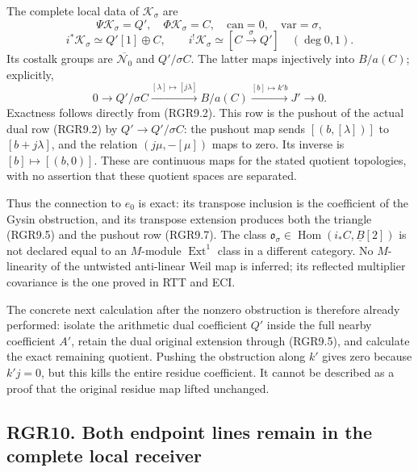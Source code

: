 The complete local data of \(\mathscr K_\sigma\) are \[
 \Psi\mathscr K_\sigma=Q',\quad \Phi\mathscr K_\sigma=C,
 \quad\mathrm{can}=0,\quad\mathrm{var}=\sigma,
\] \[
 i^*\mathscr K_\sigma\simeq Q'[1]\oplus C,
 \qquad i^!\mathscr K_\sigma\simeq[C\xrightarrow\sigma Q']
 \quad(\deg0,1).
 \tag{RGR9.6}
\] Its costalk groups are \(\overline{\mathcal N_0}\) and
\(Q'/\sigma C\). The latter maps injectively into \(B/a(C)\);
explicitly, \[
 0\longrightarrow Q'/\sigma C\xrightarrow{[\lambda]\mapsto[j\lambda]}
 B/a(C)\xrightarrow{[b]\mapsto k'b}J'\longrightarrow0.
 \tag{RGR9.7}
\] Exactness follows directly from (RGR9.2). This row is the pushout of
the actual dual row (RGR9.2) by \(Q'\to Q'/\sigma C\): the pushout map
sends \([(b,[\lambda])]\) to \([b+j\lambda]\), and the relation
\((j\mu,-[\mu])\) maps to zero. Its inverse is \([b]\mapsto[(b,0)]\).
These are continuous maps for the stated quotient topologies, with no
assertion that these quotient spaces are separated.

Thus the connection to \(e_0\) is exact: its transpose inclusion is the
coefficient of the Gysin obstruction, and its transpose extension
produces both the triangle (RGR9.5) and the pushout row (RGR9.7). The
class \(\mathfrak o_\sigma\in\operatorname{Hom}(i_*C,\underline B[2])\)
is not declared equal to an \(M\)-module \(\operatorname{Ext}^1\) class
in a different category. No \(M\)-linearity of the untwisted anti-linear
Weil map is inferred; its reflected multiplier covariance is the one
proved in RTT and ECI.

The concrete next calculation after the nonzero obstruction is therefore
already performed: isolate the arithmetic dual coefficient \(Q'\) inside
the full nearby coefficient \(A'\), retain the dual original extension
through (RGR9.5), and calculate the exact remaining quotient. Pushing
the obstruction along \(k'\) gives zero because \(k'j=0\), but this
kills the entire residue coefficient. It cannot be described as a proof
that the original residue map lifted unchanged.

\subsection{RGR10. Both endpoint lines remain in the complete local
receiver}\label{rgr10.-both-endpoint-lines-remain-in-the-complete-local-receiver}

